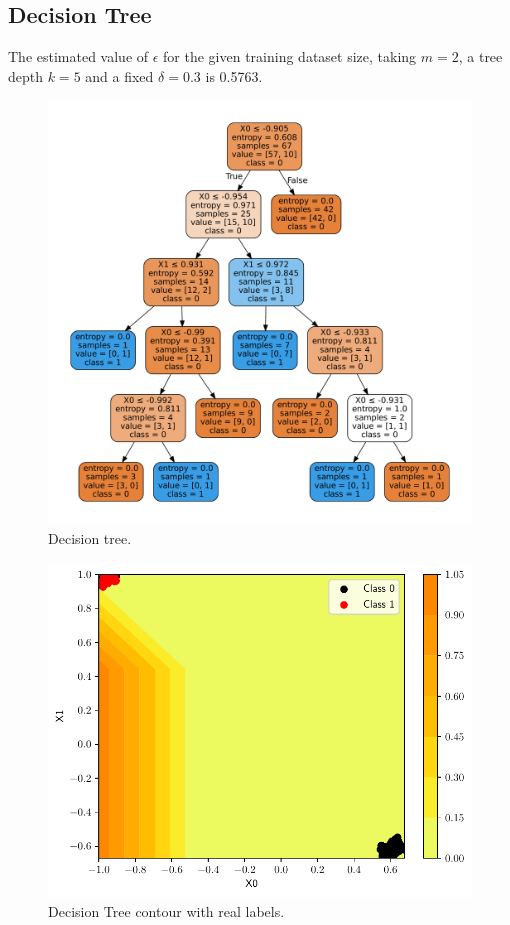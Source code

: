 \documentclass[conference]{IEEEtran}
\theoremstyle{definition}
\theoremstyle{remark}
\theoremstyle{remark}
\begin{document}
\subsection{Decision Tree}
The estimated value of $\epsilon$ for the given training dataset size, taking
$m=2$, a tree depth $k=5$ and a fixed $\delta=0.3$ is 0.5763.
\begin{figure}
    \includegraphics[width=\columnwidth]{figs/tree-emb-graph.pdf}
    \caption{Decision tree.}
\end{figure}

\begin{figure}
    \includegraphics[width=\columnwidth]{figs/tree-contour-0-1.pdf}
    \caption{Decision Tree contour with real labels.}
\end{figure}
\end{document}
